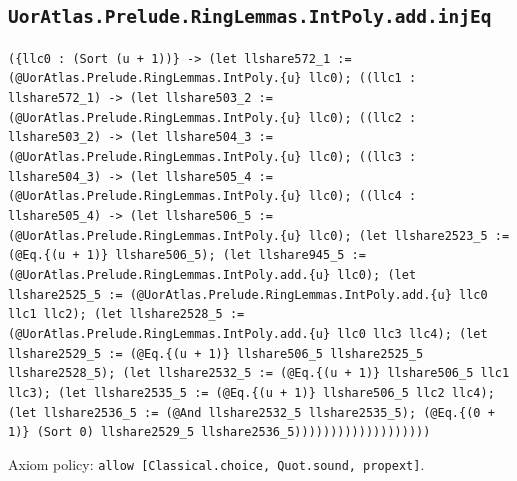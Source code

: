 \documentclass[11pt]{article}
\begin{document}
\subsection*{\texttt{UorAtlas.Prelude.RingLemmas.IntPoly.add.injEq}}
\noindent\texttt{(\{llc0 : (Sort (u + 1))\} -> (let llshare572\_1 := (@UorAtlas.Prelude.RingLemmas.IntPoly.\{u\} llc0); ((llc1 : llshare572\_1) -> (let llshare503\_2 := (@UorAtlas.Prelude.RingLemmas.IntPoly.\{u\} llc0); ((llc2 : llshare503\_2) -> (let llshare504\_3 := (@UorAtlas.Prelude.RingLemmas.IntPoly.\{u\} llc0); ((llc3 : llshare504\_3) -> (let llshare505\_4 := (@UorAtlas.Prelude.RingLemmas.IntPoly.\{u\} llc0); ((llc4 : llshare505\_4) -> (let llshare506\_5 := (@UorAtlas.Prelude.RingLemmas.IntPoly.\{u\} llc0); (let llshare2523\_5 := (@Eq.\{(u + 1)\} llshare506\_5); (let llshare945\_5 := (@UorAtlas.Prelude.RingLemmas.IntPoly.add.\{u\} llc0); (let llshare2525\_5 := (@UorAtlas.Prelude.RingLemmas.IntPoly.add.\{u\} llc0 llc1 llc2); (let llshare2528\_5 := (@UorAtlas.Prelude.RingLemmas.IntPoly.add.\{u\} llc0 llc3 llc4); (let llshare2529\_5 := (@Eq.\{(u + 1)\} llshare506\_5 llshare2525\_5 llshare2528\_5); (let llshare2532\_5 := (@Eq.\{(u + 1)\} llshare506\_5 llc1 llc3); (let llshare2535\_5 := (@Eq.\{(u + 1)\} llshare506\_5 llc2 llc4); (let llshare2536\_5 := (@And llshare2532\_5 llshare2535\_5); (@Eq.\{(0 + 1)\} (Sort 0) llshare2529\_5 llshare2536\_5)))))))))))))))))))}\par
\noindent Axiom policy: \texttt{allow [Classical.choice, Quot.sound, propext]}.\par
\end{document}

